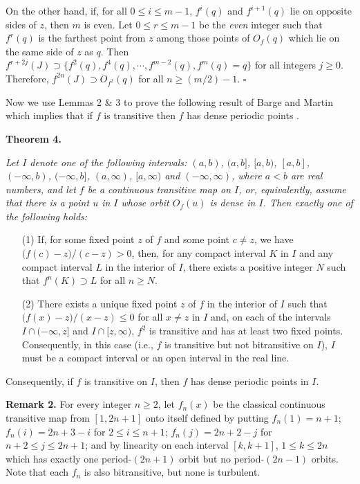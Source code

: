 \documentclass[12pt]{article}
\newcommand{\sq}{$\square$}
\begin{document}
On the other hand, if, for all $0 \le i \le m-1$, $f^i(q)$ and $f^{i+1}(q)$ lie on opposite sides of $z$, then $m$ is even.  Let $0 \le r \le m-1$ be the {\it even} integer such that $f^r(q)$ is the farthest point from $z$ among those points of $O_f(q)$ which lie on the same side of $z$ as $q$.  Then $f^{r+2j}(J) \supset \big\{ f^2(q), f^4(q), \cdots, f^{m-2}(q), f^{m}(q) = q  \big\}$ for all integers $j \ge 0$.  Therefore, $f^{2n}(J) \supset O_{f^2}(q)$ for all $n \ge (m/2) - 1$.  
\hfill\sq

Now we use Lemmas 2 \& 3 to prove the following result of Barge and Martin {\bf\cite{barge1, barge3}} which implies that if $f$ is transitive then $f$ has dense periodic points {\bf\cite{bc, vb}}.

\noindent
{\bf Theorem 4.}
{\it Let $I$ denote one of the following intervals: $(a, b)$, $(a, b]$, $[a, b)$, $[a, b]$, $(-\infty, b)$, $(-\infty, b]$, $(a, \infty)$, $[a, \infty)$ and $(-\infty, \infty)$, where $a < b$ are real numbers, and let $f$ be a continuous transitive map on $I$, or, equivalently, assume that there is a point $u$ in $I$ whose orbit $O_f(u)$ is dense in $I$.  Then exactly one of the following holds:
\begin{itemize}
\item[{\rm (1)}]
If, for some fixed point $z$ of $f$ and some point $c \ne z$, we have $\big(f(c) - z\big)/(c - z) > 0$, then, for any compact interval $K$ in $I$ and any compact interval $L$ in the interior of $I$, there exists a positive integer $N$ such that $f^n(K) \supset L$ for all $n \ge N$.  

\item[{\rm (2)}]
There exists a unique fixed point $z$ of $f$ in the interior of $I$ such that $\big(f(x) - z\big)/(x - z) \le 0$ for all $x \ne z$ in $I$ and, on each of the intervals $I \cap (-\infty, z]$ and $I \cap [z, \infty)$, $f^2$ is transitive and has at least two fixed points.  Consequently, in this case \big(i.e., $f$ is transitive but not bitransitive on $I$\big), $I$ must be a compact interval or an open interval in the real line.
\end{itemize}
Consequently, if $f$ is transitive on $I$, then $f$ has dense periodic points in $I$.}

\noindent
{\bf Remark 2.}
For every integer $n \ge 2$, let $f_n(x)$ be the classical continuous transitive map {\bf{\cite{barge2, bc}}} from $[1, 2n+1]$ onto itself defined by putting $f_n(1) = n+1$; $f_n(i) = 2n+3-i$ for $2 \le i \le n+1$; $f_n(j) = 2n+2-j$ for $n+2 \le j \le 2n+1$; and by linearity on each interval $[k, k+1]$, $1 \le k \le 2n$ which has exactly one period-$(2n+1)$ orbit but no period-$(2n-1)$ orbits. Note that each $f_n$ is also bitransitive, but none is turbulent.  
\end{document}

